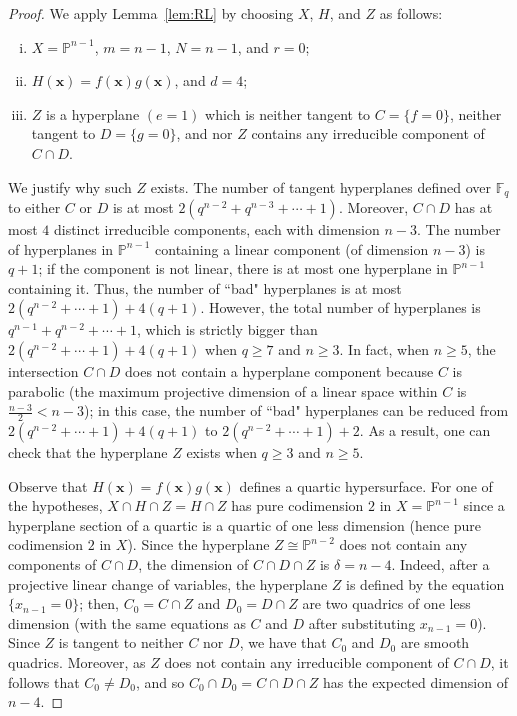 \documentclass[12pt,reqno]{amsart}
\theoremstyle{definition}
\begin{document}
\begin{proof} We apply Lemma~\ref{lem:RL} by choosing $X$, $H$, and $Z$ as follows:
\begin{enumerate}[(i)]
\item $X=\mathbb{P}^{n-1}$, $m=n-1$, $N=n-1$, and $r=0$;
\item $H(\mathbf{x})=f(\mathbf{x})g(\mathbf{x})$, and $d=4$;
\item $Z$ is a hyperplane $(e=1)$ which is neither tangent to $C=\{f=0\}$, neither tangent to $D=\{g=0\}$, and nor $Z$ contains any irreducible component of $C\cap D$. 
\end{enumerate}   
We justify why such $Z$ exists. The number of tangent hyperplanes defined over $\mathbb{F}_q$ to either $C$ or $D$ is at most $2(q^{n-2}+q^{n-3}+\cdots+1)$. Moreover, $C\cap D$ has at most $4$ distinct irreducible components, each with dimension $n-3$. The number of hyperplanes in $\mathbb{P}^{n-1}$ containing a linear component (of dimension $n-3$) is $q+1$; if the component is not linear, there is at most one hyperplane in $\mathbb{P}^{n-1}$ containing it. Thus, the number of ``bad" hyperplanes is at most $2(q^{n-2}+\cdots + 1) + 4(q+1)$. However, the total number of hyperplanes is $q^{n-1}+q^{n-2}+\cdots+1$, which is strictly bigger than $2(q^{n-2}+\cdots + 1) + 4(q+1)$ when $q\geq 7$ and $n \geq 3$. In fact, when $n\geq 5$, the intersection $C\cap D$ does not contain a hyperplane component because $C$ is parabolic (the maximum projective dimension of a linear space within $C$ is $\frac{n-3}{2}<n-3$); in this case, the number of ``bad" hyperplanes can be reduced from $2(q^{n-2}+\cdots + 1) + 4(q+1)$ to $2(q^{n-2}+\cdots + 1) + 2$. As a result, one can check that the hyperplane $Z$ exists when $q\geq 3$ and $n\geq 5$.

Observe that $H(\mathbf{x})=f(\mathbf{x})g(\mathbf{x})$ defines a quartic hypersurface. For one of the hypotheses, $X\cap H\cap Z = H\cap Z$ has pure codimension $2$ in $X=\mathbb{P}^{n-1}$ since a hyperplane section of a quartic is a quartic of one less dimension (hence pure codimension $2$ in $X$). Since the hyperplane $Z\cong\mathbb{P}^{n-2}$ does not contain any components of $C\cap D$, the dimension of $C\cap D\cap Z$ is $\delta = n-4$. Indeed, after a projective linear change of variables, the hyperplane $Z$ is defined by the equation $\{x_{n-1}=0\}$; then, $C_0 = C\cap Z$ and $D_0 = D\cap Z$ are two quadrics of one less dimension (with the same equations as $C$ and $D$ after substituting $x_{n-1}=0$). Since $Z$ is tangent to neither $C$ nor $D$, we have that $C_0$ and $D_0$ are smooth quadrics. Moreover, as $Z$ does not contain any irreducible component of $C\cap D$, it follows that $C_0\neq D_0$, and so $C_0\cap D_0 = C\cap D\cap Z$ has the expected dimension of $n-4$.


\end{proof}
\end{document}
